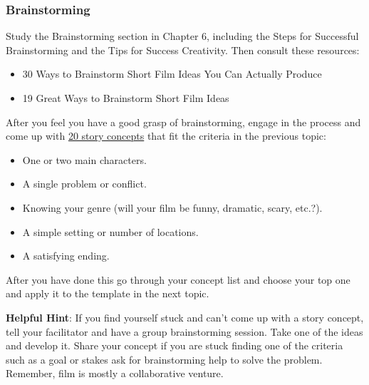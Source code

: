 \documentclass[
]{book}
\providecommand{\tightlist}{%
  \setlength{\itemsep}{0pt}\setlength{\parskip}{0pt}}
\begin{document}
\begin{reflect}
\hypertarget{brainstorming}{%
\subsubsection*{Brainstorming}\label{brainstorming}}

Study the Brainstorming section in Chapter 6, including the Steps for Successful Brainstorming and the Tips for Success Creativity. Then consult these resources:

\begin{itemize}
\tightlist
\item
  30 Ways to Brainstorm Short Film Ideas You Can Actually Produce
\item
  19 Great Ways to Brainstorm Short Film Ideas
\end{itemize}

After you feel you have a good grasp of brainstorming, engage in the process and come up with \ul{20 story concepts} that fit the criteria in the previous topic:

\begin{itemize}
\tightlist
\item
  One or two main characters.\\
\item
  A single problem or conflict.\\
\item
  Knowing your genre (will your film be funny, dramatic, scary, etc.?).\\
\item
  A simple setting or number of locations.\\
\item
  A satisfying ending.
\end{itemize}

After you have done this go through your concept list and choose your top one and apply it to the template in the next topic.
\end{reflect}

\begin{caution}
\textbf{Helpful Hint}: If you find yourself stuck and can't come up with a story concept, tell your facilitator and have a group brainstorming session. Take one of the ideas and develop it. Share your concept if you are stuck finding one of the criteria such as a goal or stakes ask for brainstorming help to solve the problem. Remember, film is mostly a collaborative venture.
\end{caution}
\end{document}
